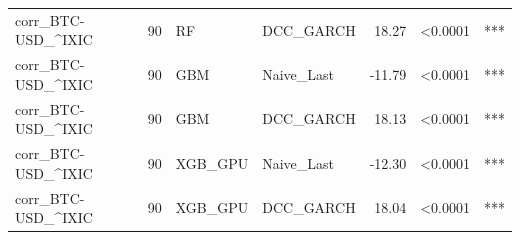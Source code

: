 \begin{table}[H]
\begin{tabular}{llllrrl}
corr_BTC-USD_^IXIC & 90 & RF & DCC_GARCH & 18.27 & <0.0001 & *** \\
corr_BTC-USD_^IXIC & 90 & GBM & Naive_Last & -11.79 & <0.0001 & *** \\
corr_BTC-USD_^IXIC & 90 & GBM & DCC_GARCH & 18.13 & <0.0001 & *** \\
corr_BTC-USD_^IXIC & 90 & XGB_GPU & Naive_Last & -12.30 & <0.0001 & *** \\
corr_BTC-USD_^IXIC & 90 & XGB_GPU & DCC_GARCH & 18.04 & <0.0001 & *** \\
\bottomrule
\end{tabular}
\end{table}